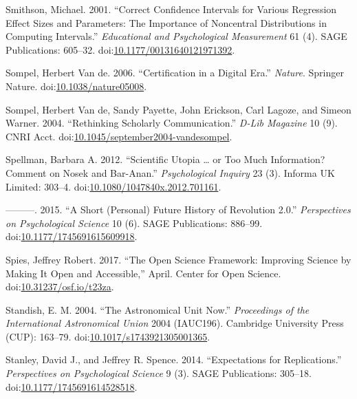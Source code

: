 \documentclass[a5paper]{book}
\begin{document}
\hypertarget{ref-doi:10.1177ux2f00131640121971392}{}
Smithson, Michael. 2001. ``Correct Confidence Intervals for Various
Regression Effect Sizes and Parameters: The Importance of Noncentral
Distributions in Computing Intervals.'' \emph{Educational and
Psychological Measurement} 61 (4). SAGE Publications: 605--32.
doi:\href{https://doi.org/10.1177/00131640121971392}{10.1177/00131640121971392}.

\hypertarget{ref-doi:10.1038ux2fnature05008}{}
Sompel, Herbert Van de. 2006. ``Certification in a Digital Era.''
\emph{Nature}. Springer Nature.
doi:\href{https://doi.org/10.1038/nature05008}{10.1038/nature05008}.

\hypertarget{ref-doi:10.1045ux2fseptember2004-vandesompel}{}
Sompel, Herbert Van de, Sandy Payette, John Erickson, Carl Lagoze, and
Simeon Warner. 2004. ``Rethinking Scholarly Communication.'' \emph{D-Lib
Magazine} 10 (9). CNRI Acct.
doi:\href{https://doi.org/10.1045/september2004-vandesompel}{10.1045/september2004-vandesompel}.

\hypertarget{ref-doi:10.1080ux2f1047840X.2012.701161}{}
Spellman, Barbara A. 2012. ``Scientific Utopia \ldots{} or Too Much
Information? Comment on Nosek and Bar-Anan.'' \emph{Psychological
Inquiry} 23 (3). Informa UK Limited: 303--4.
doi:\href{https://doi.org/10.1080/1047840x.2012.701161}{10.1080/1047840x.2012.701161}.

\hypertarget{ref-doi:10.1177ux2f1745691615609918}{}
---------. 2015. ``A Short (Personal) Future History of Revolution
2.0.'' \emph{Perspectives on Psychological Science} 10 (6). SAGE
Publications: 886--99.
doi:\href{https://doi.org/10.1177/1745691615609918}{10.1177/1745691615609918}.

\hypertarget{ref-doi:10.31237ux2fosf.ioux2ft23za}{}
Spies, Jeffrey Robert. 2017. ``The Open Science Framework: Improving
Science by Making It Open and Accessible,'' April. Center for Open
Science.
doi:\href{https://doi.org/10.31237/osf.io/t23za}{10.31237/osf.io/t23za}.

\hypertarget{ref-doi:10.1017ux2fs1743921305001365}{}
Standish, E. M. 2004. ``The Astronomical Unit Now.'' \emph{Proceedings
of the International Astronomical Union} 2004 (IAUC196). Cambridge
University Press (CUP): 163--79.
doi:\href{https://doi.org/10.1017/s1743921305001365}{10.1017/s1743921305001365}.

\hypertarget{ref-doi:10.1177ux2f1745691614528518}{}
Stanley, David J., and Jeffrey R. Spence. 2014. ``Expectations for
Replications.'' \emph{Perspectives on Psychological Science} 9 (3). SAGE
Publications: 305--18.
doi:\href{https://doi.org/10.1177/1745691614528518}{10.1177/1745691614528518}.
\end{document}
